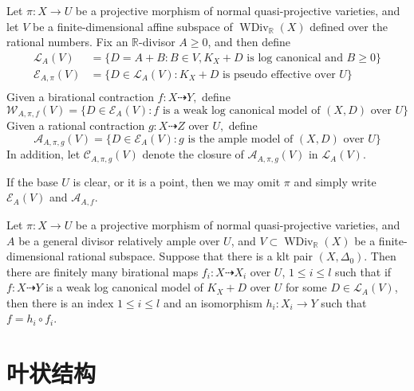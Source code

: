 \begin{defn}\label{polytopeofdivisor}
	\cite[Definition 1.1.4]{BCHM10} Let $ \pi: X\to U $ be a projective morphism of normal quasi-projective varieties, and let $ V $ be a finite-dimensional affine subspace of $ \operatorname{WDiv}_{\mathbb{R}}(X) $ defined over the rational numbers. Fix an $ \mathbb{R} $-divisor $ A\geqslant 0 $, and then define
	\[
		\begin{aligned}
			\mathcal{L}_A(V)       & =\{D=A+B:B \in V,  K_X+D \text{ is log canonical and  } B\geqslant0 \} \\
			\mathcal{E}_{A,\pi}(V) & =\{D\in \mathcal{L}_A(V): K_X+D \text{ is pseudo effective over } U\}  \\
		\end{aligned}
	\]
	Given a birational contraction $ f:X \dashrightarrow Y,$ define
	\[ \mathcal{W}_{A,\pi,f}(V)=\{D\in \mathcal{E}_{A}(V): f \text{ is a weak log canonical model of  } (X,D) \text{ over }U\} \]
	Given a rational contraction $g:X\dashrightarrow Z  $ over $ U, $ define
	\[ \mathcal{A}_{A,\pi,g}(V)=\{D\in \mathcal{E}_{A}(V): g \text{ is the ample model of  } (X,D) \text{ over }U\} \]
	In addition, let $ \mathcal{C}_{A,\pi,g}(V) $ denote the closure of $ \mathcal{A}_{A,\pi,g}(V) $ in $\mathcal{L}_{A}(V)$.

	If the base $U$ is clear, or it is a point, then we may omit $\pi$ and simply write $\mathcal{E}_{A}(V)$ and $\mathcal{A}_{A,f}$.
\end{defn}

\begin{thm}\label{finitewlcm}

	Let $\pi: X\to U$ be a projective morphism of normal quasi-projective varieties, and $A$ be a general divisor relatively ample over $U$, and $V \subset \operatorname{WDiv}_{\mathbb{R}}(X)$ be a finite-dimensional rational subspace. Suppose that there is a klt pair $(X,\Delta_{0})$. Then there are finitely many birational maps $f_{i}:X \dashrightarrow X_{i}$ over $U$, $1\leqslant i\leqslant l$ such that if $f:X \dashrightarrow  Y$ is a weak log canonical model of $K_{X}+D$ over $U$ for some $D \in \mathcal{L}_{A}(V)$, then there is an index $1\leqslant i\leqslant l$ and an  isomorphism  $h_{i}:X_{i} \to Y$  such that $f=h_{i}\circ f_{i}$.

\end{thm}
\section{叶状结构}

